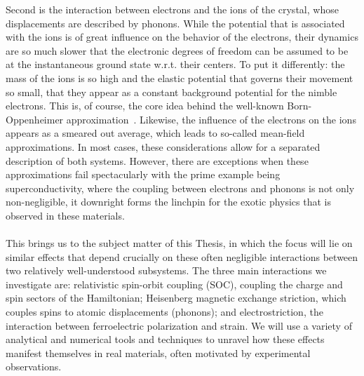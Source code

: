 Second is the interaction between electrons and the ions of the crystal, whose displacements are described by phonons.
While the potential that is associated with the ions is of great influence on the behavior of the electrons, their dynamics are so much slower that the electronic degrees of freedom can be assumed to be at the instantaneous ground state w.r.t. their centers.
To put it differently: the mass of the ions is so high and the elastic potential that governs their movement so small, that they appear as a constant background potential for the nimble electrons.
This is, of course, the core idea behind the well-known Born-Oppenheimer approximation~\cite{Born1927}.
Likewise, the influence of the electrons on the ions appears as a smeared out average, which leads to so-called mean-field approximations.
In most cases, these considerations allow for a separated description of both systems.
However, there are exceptions when these approximations fail spectacularly with the prime example being superconductivity, where the coupling between electrons and phonons is not only non-negligible, it downright forms the linchpin for the exotic physics that is observed in these materials.
\\\\
This brings us to the subject matter of this Thesis, in which the focus will lie on similar effects that depend crucially on these often negligible interactions between two relatively well-understood subsystems.
The three main interactions we investigate are: relativistic spin-orbit coupling (SOC), coupling the charge and spin sectors of the Hamiltonian; Heisenberg magnetic exchange striction, which couples spins to atomic displacements (phonons); and electrostriction, the interaction between ferroelectric polarization and strain.
We will use a variety of analytical and numerical tools and techniques to unravel how these effects manifest themselves in real materials, often motivated by experimental observations.

